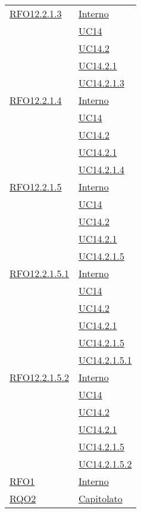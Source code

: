 \begin{longtable}{|>{\centering}m{5cm}|m{5cm}<{\centering}|}
 \hyperlink{RFO12.2.1.3}{RFO12.2.1.3} 
 & \hyperlink{Interno}{Interno}\\
& \hyperref[UC14]{UC14}\\
& \hyperref[UC14.2]{UC14.2}\\
& \hyperref[UC14.2.1]{UC14.2.1}\\
& \hyperref[UC14.2.1.3]{UC14.2.1.3}\\\hline

  \hyperlink{RFO12.2.1.4}{RFO12.2.1.4} 
 & \hyperlink{Interno}{Interno}\\
& \hyperref[UC14]{UC14}\\
& \hyperref[UC14.2]{UC14.2}\\
& \hyperref[UC14.2.1]{UC14.2.1}\\
& \hyperref[UC14.2.1.4]{UC14.2.1.4}\\\hline

 \hyperlink{RFO12.2.1.5}{RFO12.2.1.5} 
 & \hyperlink{Interno}{Interno}\\
& \hyperref[UC14]{UC14}\\
& \hyperref[UC14.2]{UC14.2}\\
& \hyperref[UC14.2.1]{UC14.2.1}\\
& \hyperref[UC14.2.1.5]{UC14.2.1.5}\\\hline

 \hyperlink{RFO12.2.1.5.1}{RFO12.2.1.5.1} 
 & \hyperlink{Interno}{Interno}\\
& \hyperref[UC14]{UC14}\\
& \hyperref[UC14.2]{UC14.2}\\
& \hyperref[UC14.2.1]{UC14.2.1}\\
& \hyperref[UC14.2.1.5]{UC14.2.1.5}\\
& \hyperref[UC14.2.1.5.1]{UC14.2.1.5.1}\\\hline

 \hyperlink{RFO12.2.1.5.2}{RFO12.2.1.5.2} 
 & \hyperlink{Interno}{Interno}\\
& \hyperref[UC14]{UC14}\\
& \hyperref[UC14.2]{UC14.2}\\
& \hyperref[UC14.2.1]{UC14.2.1}\\
& \hyperref[UC14.2.1.5]{UC14.2.1.5}\\
& \hyperref[UC14.2.1.5.2]{UC14.2.1.5.2}\\\hline

 \hyperlink{RQO1}{RFO1} 
 & \hyperlink{Interno}{Interno}\\
\hline

 \hyperlink{RQO2}{RQO2} & \hyperlink{Capitolato}{Capitolato}\\
\hline


\end{longtable}
